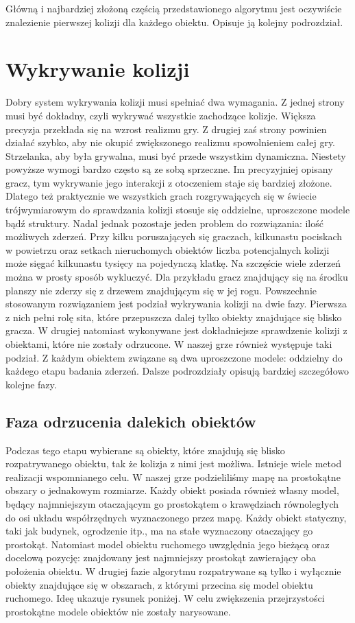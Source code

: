 \documentclass[licencjacka]{pracamgr}
\begin{document}
Główną i najbardziej złożoną częścią przedstawionego algorytmu jest oczywiście znalezienie pierwszej kolizji dla każdego obiektu. Opisuje ją kolejny podrozdział.

\section{Wykrywanie kolizji}

Dobry system wykrywania kolizji musi spełniać dwa wymagania. Z jednej strony musi być dokładny, czyli wykrywać wszystkie zachodzące kolizje. Większa precyzja przekłada się na wzrost realizmu gry. Z drugiej zaś strony powinien działać szybko, aby nie okupić zwiększonego realizmu spowolnieniem całej gry. Strzelanka, aby była grywalna, musi być przede wszystkim dynamiczna. Niestety powyższe wymogi bardzo często są ze sobą sprzeczne. Im precyzyjniej opisany gracz, tym wykrywanie jego interakcji z otoczeniem staje się bardziej złożone. Dlatego też praktycznie we wszystkich grach rozgrywających się w świecie trójwymiarowym do sprawdzania kolizji stosuje się oddzielne, uproszczone modele bądź struktury. Nadal jednak pozostaje jeden problem do rozwiązania: ilość możliwych zderzeń. Przy kilku poruszających się graczach, kilkunastu pociskach w powietrzu oraz setkach nieruchomych obiektów liczba potencjalnych kolizji może sięgać kilkunastu tysięcy na pojedynczą klatkę. Na szczęście wiele zderzeń można w prosty sposób wykluczyć. Dla przykładu gracz znajdujący się na środku planszy nie zderzy się z drzewem znajdującym się w jej rogu. Powszechnie stosowanym rozwiązaniem jest podział wykrywania kolizji na dwie fazy. Pierwsza z nich pełni rolę sita, które przepuszcza dalej tylko obiekty znajdujące się blisko gracza. W drugiej natomiast wykonywane jest dokładniejsze sprawdzenie kolizji z obiektami, które nie zostały odrzucone. W naszej grze również występuje taki podział. Z każdym obiektem związane są dwa uproszczone modele: oddzielny do każdego etapu badania zderzeń. Dalsze podrozdziały opisują bardziej szczegółowo kolejne fazy.

\subsection{Faza odrzucenia dalekich obiektów}

Podczas tego etapu wybierane są obiekty, które znajdują się blisko rozpatrywanego obiektu, tak że kolizja z nimi jest możliwa. Istnieje wiele metod realizacji wspomnianego celu. W naszej grze podzieliliśmy mapę na prostokątne obszary o jednakowym rozmiarze. Każdy obiekt posiada również własny model, będący najmniejszym otaczającym go prostokątem o krawędziach równoległych do osi układu współrzędnych wyznaczonego przez mapę. Każdy obiekt statyczny, taki jak budynek, ogrodzenie itp., ma na stałe wyznaczony otaczający go prostokąt. Natomiast model obiektu ruchomego uwzględnia jego bieżącą oraz docelową pozycję: znajdowany jest najmniejszy prostokąt zawierający oba położenia obiektu. W drugiej fazie algorytmu rozpatrywane są tylko i wyłącznie obiekty znajdujące się w obszarach, z którymi przecina się model obiektu ruchomego. Ideę ukazuje rysunek poniżej. W celu zwiększenia przejrzystości prostokątne modele obiektów nie zostały narysowane.
\end{document}
